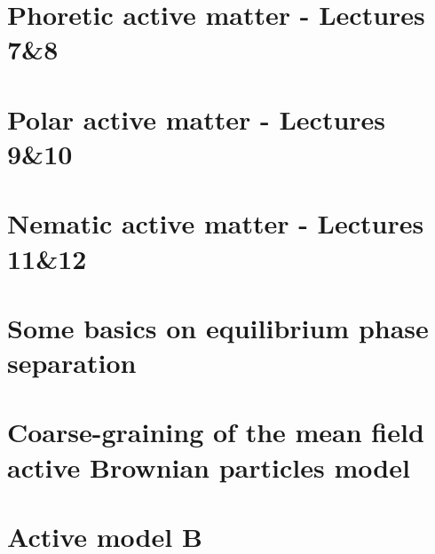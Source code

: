 \documentclass[10pt, a4paper, oneside]{book}
\begin{document}
    \chapter{Phoretic active matter - Lectures 7\&8}
    \label{chap_phoretic}

    \chapter{Polar active matter  - Lectures 9\&10}
    \label{chap_polar}
    

    \chapter{Nematic active matter  - Lectures 11\&12}
    \label{chap_nematic}

    \appendix

    \chapter{Some basics on equilibrium phase separation}
    

    \chapter{Coarse-graining of the mean field active Brownian particles model}
    

    \chapter{Active model B}
    

    
    

    
    
\end{document}
